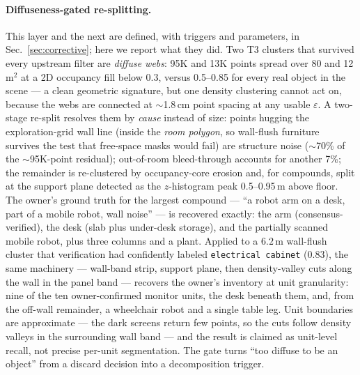 \paragraph{Diffuseness-gated re-splitting.}
This layer and the next are defined, with triggers and parameters, in
Sec.~\ref{sec:corrective}; here we report what they did.
Two T3 clusters that survived every upstream filter are \emph{diffuse
webs}: 95K and 13K points spread over 80 and 12\,m$^2$ at a 2D occupancy
fill below 0.3, versus 0.5--0.85 for every real object in the scene ---
a clean geometric signature, but one density clustering cannot act on,
because the webs are connected at $\sim$1.8\,cm point spacing at any
usable $\varepsilon$. A two-stage re-split resolves them by \emph{cause}
instead of size: points hugging the exploration-grid wall line (inside
the \emph{room polygon}, so wall-flush furniture survives the test that
free-space masks would fail) are structure noise ($\sim$70\% of the
$\sim$95K-point residual); out-of-room bleed-through accounts for another
7\%; the remainder is re-clustered by occupancy-core erosion and, for
compounds, split at the support plane detected as the $z$-histogram
peak 0.5--0.95\,m above floor. The owner's ground truth for the largest
compound --- ``a robot arm on a desk, part of a mobile robot, wall
noise'' --- is recovered exactly: the arm (consensus-verified), the
desk (slab plus under-desk storage), and the partially scanned mobile
robot, plus three columns and a plant. Applied to a $6.2$\,m
wall-flush cluster that verification had confidently labeled
\texttt{electrical cabinet} (0.83), the same machinery --- wall-band
strip, support plane, then density-valley cuts along the wall in the
panel band --- recovers the owner's inventory at unit granularity:
nine of the ten owner-confirmed monitor units, the desk beneath them,
and, from the off-wall remainder, a wheelchair robot and a single
table leg. Unit boundaries are approximate --- the dark screens return
few points, so the cuts follow density valleys in the surrounding wall
band --- and the result is claimed as unit-level recall, not precise
per-unit segmentation. The gate turns ``too diffuse to be an object''
from a discard decision into a decomposition trigger.

